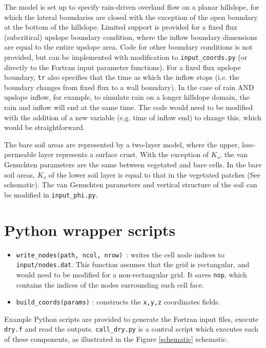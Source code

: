 \documentclass{article}
\newcommand{\code}[1]{\texttt{#1}}
\begin{document}
The model is set up to specify rain-driven overland flow on a planar hillslope, for which the lateral boundaries are closed with the exception of the open boundary at the bottom of the hillslope.  Limited support is provided for a fixed flux (subcritical) upslope boundary condition,  where the inflow boundary dimensions are equal to the entire upslope area.  Code for other boundary conditions is not provided, but can be implemented with modification to \code{input\_coords.py} (or directly to the Fortran input parameter functions).
For a fixed flux upslope boundary, \code{tr} also specifies that the time as which the inflow stops (i.e. the boundary changes from fixed flux to a wall boundary).  In the case of rain AND upslope inflow, for example, to simulate rain on a longer hillslope domain, the rain and inflow will end at the same time. The code would need to be modified with the addition of a new variable (e.g. time of inflow end) to change this, which would be straightforward. 

The bare soil areas are represented by a two-layer model, where the upper, less-permeable  layer represents a surface crust.  With the exception of $K_{s}$, the van Genuchten parameters are the same between vegetated and bare cells. In the bare soil areas, $K_{s}$ of the lower soil layer is  equal to that in the vegetated patches (See schematic).
The van Genuchten parameters and vertical structure of the soil can be modified in \code{input\_phi.py}.


\section{Python wrapper scripts}
\label{python_wrap}

\begin{itemize}
\item \code{write\_nodes(path, ncol, nrow)  }: writes the cell node indices to \code{input/nodes.dat}.  
    This function assumes that the grid is rectangular, and would need to be modified for a non-rectangular grid. 
       It saves \code{nop}, which contains the indices of the nodes surrounding each cell face.
\item \code{build\_coords(params)} : constructs the \code{x,y,z} coordinates fields. 
\end{itemize}



Example Python scripts are provided to generate the Fortran input files, execute \code{dry.f} and read the outputs.   \code{call\_dry.py} is a control script which executes each of these components, as illustrated in the Figure \ref{schematic} schematic.
\end{document}
